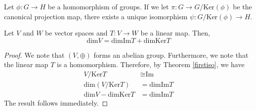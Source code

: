 \begin{theorem}
  \begin{flushleft}
    \begin{minipage}{0.6\textwidth}
      \label{firstiso}
      Let $\phi: G \rightarrow H$ be a homomorphism of groups. If we let $\pi : G \rightarrow G/\text{Ker}(\phi)$ be the canonical projection map, there exists a unique isomorphism $\psi: G/\text{Ker}(\phi) \rightarrow H$.
    \end{minipage}%
    \hfill
    \begin{minipage}{0.35\textwidth}
    \end{minipage}
  \end{flushleft}
\end{theorem}

\begin{corollary}
  Let $V$ and $W$ be vector spaces and $T:V\rightarrow W$ be a linear map. Then,
  \begin{equation*}
    \text{dim}V = \text{dim}\text{Im} T + \text{dim}\text{Ker}T
  \end{equation*}
\end{corollary}

\begin{proof}
  We note that $(V, \oplus)$ forms an abelian group. Furthermore, we note that the linear map $T$ is a homomorphism. Therefore, by Theorem \ref{firstiso}, we have 
  \begin{align*}
    V/\text{Ker}T &\cong \text{Im} \\
    \text{dim}(V/\text{Ker}T) &= \text{dim}\text{Im}T\\
    \text{dim}V-\text{dim}\text{Ker}T&=\text{dim}\text{Im}T
  \end{align*}
  The result follows immediately.
\end{proof}

